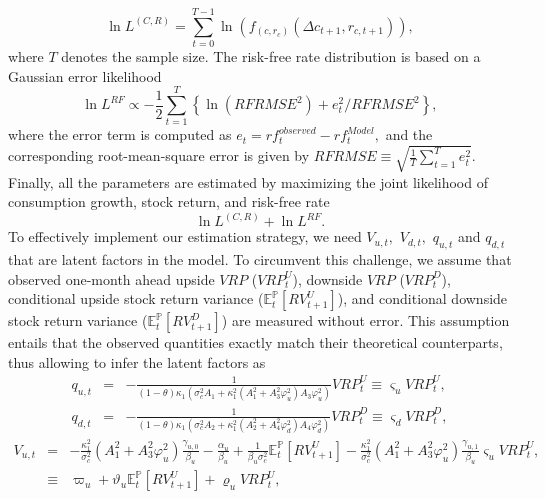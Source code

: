 \documentclass[11pt]{article}
\begin{document}
\begin{equation}
\ln L^{\left( C,R\right) }=\sum_{t=0}^{T-1}\ln \left( f_{\left(
c,r_{c}\right) }\left( \Delta c_{t+1},r_{c,t+1}\right) \right),
\label{LikePhys}
\end{equation} where $T$ denotes the sample size. The risk-free rate distribution is based on a Gaussian error likelihood
\begin{equation*}
\ln L^{RF}\varpropto -\frac{1}{2}\sum_{t=1}^{T}\left\{ \ln \left(
RFRMSE^{2}\right) +e_{t}^{2}/RFRMSE^{2}\right\} ,
\end{equation*} where the error term is computed as $e_{t}=rf_{t}^{observed}-rf_{t}^{Model},$ and the corresponding root-mean-square error is given by $
RFRMSE\equiv \sqrt{\frac{1}{T}\sum_{t=1}^{T}e_{t}^{2}}.$ Finally, all the parameters are estimated by maximizing the joint likelihood of consumption growth,
stock return, and risk-free rate
\begin{equation}
\ln L^{\left( C,R\right) }+\ln L^{RF}.  \label{jointlik}
\end{equation}
To effectively implement our estimation strategy, we need $V_{u,t},$  $V_{d,t},$ $q_{u,t}$ and $q_{d,t}$ that are latent factors in the model. To circumvent this challenge, we assume that observed one-month ahead upside $VRP$ ($VRP_{t}^{U}$), downside $VRP$ ($VRP_{t}^{D}$), conditional upside stock return variance ($\mathbb{E}_{t}^{\mathbb{P}}[RV_{t+1}^{U}]$), and conditional downside stock return variance ($\mathbb{E}_{t}^{\mathbb{P}}[RV_{t+1}^{D}]$) are measured without error. This assumption entails that the observed quantities exactly match their theoretical counterparts, thus allowing to infer the latent factors as
\begin{eqnarray*}
q_{u,t} &=&-\frac{1}{(1-\theta )\kappa _{1}\left( \sigma
_{c}^{2}A_{1}+\kappa _{1}^{2}\left( A_{1}^{2}+A_{3}^{2}\varphi
_{u}^{2}\right) A_{3}\varphi _{u}^{2}\right) }VRP_{t}^{U}\equiv \varsigma
_{u}VRP_{t}^{U}, \\
q_{d,t} &=&-\frac{1}{(1-\theta )\kappa _{1}\left( \sigma
_{c}^{2}A_{2}+\kappa _{1}^{2}\left( A_{2}^{2}+A_{4}^{2}\varphi
_{d}^{2}\right) A_{4}\varphi _{d}^{2}\right) }VRP_{t}^{D}\equiv \varsigma
_{d}VRP_{t}^{D},
\end{eqnarray*}%
\begin{eqnarray*}
V_{u,t} &=&-\frac{\kappa _{1}^{2}}{\sigma _{c}^{2}}\left(
A_{1}^{2}+A_{3}^{2}\varphi _{u}^{2}\right) \frac{\gamma _{u,0}}{\beta _{u}}-%
\frac{\alpha _{u}}{\beta _{u}}+\frac{1}{\beta _{u}\sigma _{c}^{2}}\mathbb{E}_{t}^{\mathbb{P}}[RV_{t+1}^{U}]-\frac{\kappa
_{1}^{2}}{\sigma _{c}^{2}}\left( A_{1}^{2}+A_{3}^{2}\varphi _{u}^{2}\right)
\frac{\gamma _{u,1}}{\beta _{u}}\varsigma _{u}VRP_{t}^{U}, \\
&\equiv &\varpi _{u}+\vartheta _{u}\mathbb{E}_{t}^{\mathbb{P}}[RV_{t+1}^{U}]+\varrho _{u}VRP_{t}^{U},
\end{eqnarray*}
\end{document}
